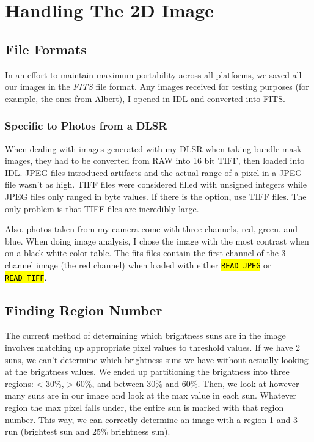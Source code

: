 \documentclass[10pt]{scrartcl}
\begin{document}

\clearpage

\section{Handling The 2D Image} %
\label{sec:handling_the_2d_image}

\subsection{File Formats} %
\label{sub:file_formats}
In an effort to maintain maximum portability across all platforms, we saved all our images in the \emph{FITS} file format. Any images received for testing purposes (for example, the ones from Albert), I opened in IDL and converted into FITS. 

\subsubsection{Specific to Photos from a DLSR} %
 \label{ssub:specific_to_photos_from_a_dlsr}
When dealing with images generated with my DLSR when taking bundle mask images, they had to be converted from RAW into 16 bit TIFF, then loaded into IDL. JPEG files introduced artifacts and the actual range of a pixel in a JPEG file wasn't as high. TIFF files were considered filled with unsigned integers while JPEG files only ranged in byte values. If there is the option, use TIFF files. The only problem is that TIFF files are incredibly large.  

Also, photos taken from my camera come with three channels, red, green, and blue. When doing image analysis, I chose the image with the most contrast when on a black-white color table. The fits files contain the first channel of the 3 channel image (the red channel) when loaded with either \hl{\texttt{READ\_JPEG}} or \hl{\texttt{READ\_TIFF}}.

\subsection{Finding Region Number} %
\label{sub:finding_region_number}
The current method of determining which brightness suns are in the image involves matching up appropriate pixel values to threshold values. If we have 2 suns, we can't determine which brightness suns we have without actually looking at the brightness values. We ended up partitioning the brightness into three regions: < 30\%, > 60\%, and between 30\% and 60\%. Then, we look at however many suns are in our image and look at the max value in each sun. Whatever region the max pixel falls under, the entire sun is marked with that region number. This way, we can correctly determine an image with a region 1 and 3 run (brightest sun and 25\% brightness sun). 
\end{document}
